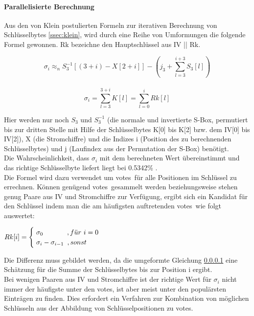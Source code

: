 \documentclass[10pt,a4paper]{article}
\begin{document}
\paragraph{Parallelisierte Berechnung}\label{ssec:p2}
Aus den von Klein postulierten Formeln zur iterativen Berechnung von Schlüsselbytes \ref{ssec:klein}, wird durch eine Reihe von Umformungen \cite[Kapitel 4, Formeln (3)-(5)]{TWP07} die folgende Formel gewonnen. Rk bezeichne den Hauptschlüssel aus IV || Rk.
\begin{center}
\[\sigma_i \approx_n S_3^{-1} [(3 + i) - X[2 + i]] - \left(j_3 + \sum_{l=3}^{i+3} S_3[l]\right)\]
\\\vspace{0.2em}
\[\sigma_i = \sum_{l=3}^{3+i} K[l] = \sum_{l=0}^{i} Rk[l]\]
\end{center}
\vspace{0.5em}
Hier werden nur noch $ S_3$ und $S_3^{-1}$ (die normale und invertierte S-Box, permutiert bis zur dritten Stelle mit Hilfe der Schlüsselbytes K[0] bis K[2] bzw. dem IV[0] bis IV[2]), X (die Stromchiffre) und die Indizes i (Position des zu berechnenden Schlüsselbytes) und j (Laufindex aus der Permutation der S-Box) benötigt.\\
Die Wahrscheinlichkeit, dass $\sigma_i$ mit dem berechneten Wert übereinstimmt und das richtige Schlüsselbyte liefert liegt bei 0.5342\% \cite[Kapitel 4, Formel (6)]{TWP07}.\\
Die Formel wird dazu verwendet um \glqq votes\grqq\ für alle Positionen im Schlüssel zu errechnen. Können genügend \glqq votes\grqq\ gesammelt werden beziehungsweise stehen genug Paare aus IV und Stromchiffre zur Verfügung, ergibt sich ein Kandidat für den Schlüssel indem man die am häufigsten auftretenden \glqq votes\grqq\ wie folgt auswertet:
\begin{center}
$Rk[i] = \begin{cases}\hspace{0.3em} \sigma_0 \hspace{3.5em}, f\ddot{u}r\ i=0 \\ \hspace{0.3em}\sigma_i - \sigma_{i-1}\hspace{0.5em}, sonst \\\end{cases}$
\end{center}
Die Differenz muss gebildet werden, da die umgeformte Gleichung \ref{ssec:p2} eine Schätzung für die Summe der Schlüsselbytes bis zur Position i ergibt.\\
Bei wenigen Paaren aus IV und Stromchiffre ist der richtige Wert für $\sigma_i$ nicht immer der häufigste unter den \glqq votes\grqq , ist aber meist unter den populärsten Einträgen zu finden. Dies erfordert ein Verfahren zur Kombination von möglichen Schlüsseln aus der Abbildung von Schlüsselpositionen zu \glqq votes\grqq .
\end{document}
